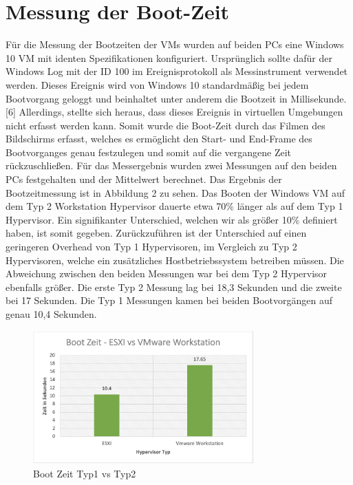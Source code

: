 \documentclass[conference]{IEEEtran}
\begin{document}
\section{Messung der Boot-Zeit}
\label{Messung der CPU Performance}
Für die Messung der Bootzeiten der VMs wurden auf beiden PCs eine Windows 10 VM mit identen Spezifikationen konfiguriert. Ursprünglich sollte dafür der Windows Log mit der ID 100 im Ereignisprotokoll als Messinstrument verwendet werden. Dieses Ereignis wird von Windows 10 standardmäßig bei jedem Bootvorgang geloggt und beinhaltet unter anderem die Bootzeit in Millisekunde. [6] Allerdings, stellte sich heraus, dass dieses Ereignis in virtuellen Umgebungen nicht erfasst werden kann. Somit wurde die Boot-Zeit durch das Filmen des Bildschirms erfasst, welches es ermöglicht den Start- und End-Frame des Bootvorganges genau festzulegen und somit auf die vergangene Zeit rückzuschließen. Für das Messergebnis wurden zwei Messungen auf den beiden PCs festgehalten und der Mittelwert berechnet.
Das Ergebnis der Bootzeitmessung ist in Abbildung 2 zu sehen. Das Booten der Windows VM auf dem Typ 2 Workstation Hypervisor dauerte etwa 70\% länger als auf dem Typ 1 Hypervisor. Ein signifikanter Unterschied, welchen wir als größer 10\% definiert haben, ist somit gegeben. Zurückzuführen ist der Unterschied auf einen geringeren Overhead von Typ 1 Hypervisoren, im Vergleich zu Typ 2 Hypervisoren, welche ein zusätzliches Hostbetriebssystem betreiben müssen. Die Abweichung zwischen den beiden Messungen war bei dem Typ 2 Hypervisor ebenfalls größer. Die erste Typ 2 Messung lag bei 18,3 Sekunden und die zweite bei 17 Sekunden. Die Typ 1 Messungen kamen bei beiden Bootvorgängen auf genau 10,4 Sekunden.

\begin{figure}[!h]
	\centering
	\includegraphics[keepaspectratio,width=8.5cm,height=0.75\textheight]{bootzeit.png}
	\caption{Boot Zeit Typ1 vs Typ2}
	\label{architecture}
\end{figure}
\end{document}
